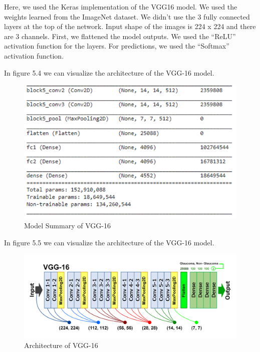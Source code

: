 \vspace{5mm}
Here, we used the Keras implementation of the VGG16 model. We used the weights learned from the ImageNet dataset. We didn’t use the 3 fully connected layers at the top of the network. Input shape of the images is 224 x 224 and there are 3 channels. First, we flattened the model outputs. We used the “ReLU” activation function for the layers. For predictions, we used the “Softmax” activation function. 

\vspace{5mm}
In figure 5.4 we can visualize the architecture of the VGG-16  model.

\vspace{5mm}
\begin{figure}[hbt!]
\centering
\includegraphics[scale=0.5]{images/fig-8.png}
\caption{Model Summary of VGG-16}
\label{fig:x Model Summary of VGG-16}
\end{figure}

\vspace{5mm}
In figure 5.5 we can visualize the architecture of the VGG-16  model.

\vspace{5mm}
\begin{figure}[hbt!]
\centering
\includegraphics[scale=0.75]{images/Architecture of VGG-16.png}
\caption{Architecture of VGG-16}
\label{fig:x Architecture of VGG-16}
\end{figure}

